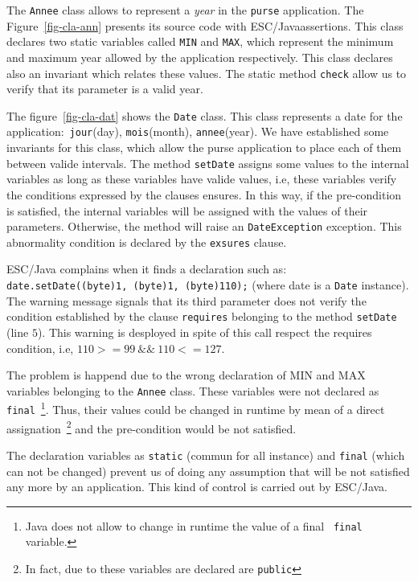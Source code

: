 \documentclass[a4paper]{llncs}
\begin{document}
The \texttt{Annee} class allows to represent a \textit{year} in the
\texttt{purse} application. The Figure~\ref{fig-cla-ann} presents its
source code with ESC/Javaassertions. This class declares two 
static variables called \texttt{MIN} and \texttt{MAX}, which represent
the minimum and maximum year allowed by the application
respectively. This class declares
also an invariant which relates these values. The static method
\texttt{check} allow us to verify that its parameter is a valid
year. 

The figure~\ref{fig-cla-dat} shows the \texttt{Date} class. This class
represents a date for the application$:$ \texttt{jour}(day),
\texttt{mois}(month), \texttt{annee}(year). We have established some
invariants for this class, which allow the purse application to place
each of them between valide intervals. The method \texttt{setDate}
assigns some values to the internal variables as long as
these variables have valide values, i.e, these variables verify the
conditions expressed by the clauses ensures. In this way, if the
pre-condition is satisfied, the internal variables will be assigned
with the values of their parameters. Otherwise, the method will raise
an \texttt{DateException} exception. This abnormality condition is
declared by the \texttt{exsures} clause. 

ESC/Java complains when it finds a declaration such as$:$ 
\mbox{\tt date.setDate((byte)1, (byte)1, (byte)110);} (where date is a
\texttt{Date} instance). The warning message signals that its third
parameter does not verify the condition established by the clause
\texttt{requires} belonging to the method \texttt{setDate} (line
$5$). This warning is desployed in spite of this call respect the
requires condition, i.e, $110>=99\ \&\&\ 110<= 127$. 

The problem is happend due to the wrong declaration of \textsc{MIN}
and \textsc{MAX} variables belonging to the \texttt{Annee}
class. These variables were not declared as \texttt{final}~\footnote{{\sc
Java} does not allow to change in runtime the value of a final {\tt
final} variable.}. Thus, their values could be changed in runtime by
mean of a direct assignation~\footnote{In fact, due to these variables
are declared are \texttt{public}} and the pre-condition would be not
satisfied. 


The declaration variables as \texttt{static} (commun for all instance)
and \texttt{final} (which can not be changed) prevent us of doing
any assumption that will be not satisfied any more by an
application. This kind of control is carried out by
ESC/Java. 
\end{document}

